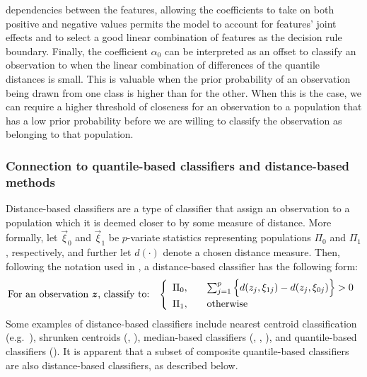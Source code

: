 dependencies between the features, allowing the coefficients to take on both
positive and negative values permits the model to account for features' joint
effects and to select a good linear combination of features as the decision rule
boundary.  Finally, the coefficient $\alpha_0$ can be interpreted as an offset
to classify an observation to when the linear combination of differences of the
quantile distances is small.  This is valuable when the prior probability of an
observation being drawn from one class is higher than for the other.  When this
is the case, we can require a higher threshold of closeness for an observation
to a population that has a low prior probability before we are willing to
classify the observation as belonging to that population.




\subsubsection{Connection to quantile-based classifiers and distance-based
  methods }
\label{sec:similarities-to-existing}

Distance-based classifiers are a type of classifier that assign an observation
to a population which it is deemed closer to by some measure of distance.  More
formally, let $\vec{\xi}_0$ and $\vec{\xi}_1$ be $p$-variate statistics
representing populations $\Pi_0$ and $\Pi_1$, respectively, and further let
$d(\cdot)$ denote a chosen distance measure. Then, following the notation used
in \cite{hennig2016}, a distance-based classifier has the following form:
\begin{equation}
  \label{eq:distance-based-classifier}
  \text{For an observation $\vec{z}$, classify to:}  \hspace{3mm}
  \left\{
    \begin{array}{lll}
      \Pi_0, & & \sum_{j=1}^p
                 \Big\{
                 d(z_j, \xi_{1j}) - d(z_j, \xi_{0j})
                 \Big\} > 0 \\[1ex]
      \Pi_1, & & \text{otherwise}
    \end{array}
  \right.
\end{equation}
Some examples of distance-based classifiers include nearest centroid
classification (e.g.\ \cite{hastie2009}), shrunken centroids
(\cite{tibshirani2002}, \cite{wang2007}), median-based classifiers
(\cite{jornsten2004}, \cite{ghosh2005}, \cite{hall2012}), and quantile-based
classifiers (\cite{hennig2016}).  It is apparent that a subset of composite
quantile-based classifiers are also distance-based classifiers, as described
below.

